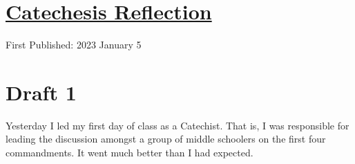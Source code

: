 \documentclass[12pt]{article}[titlepage]
\newcommand{\1}{\={a}}
\newcommand{\2}{\={e}}
\newcommand{\3}{\={\i}}
\newcommand{\4}{\=o}
\newcommand{\5}{\=u}
\newcommand{\6}{\={A}}
\renewcommand{\,}{\textsuperscript{,}}
\begin{document}
\doublespacing
\section{\href{catechesis.html}{Catechesis Reflection}}
First Published: 2023 January 5

\section{Draft 1}
Yesterday I led my first day of class as a Catechist.
That is, I was responsible for leading the discussion amongst a group of middle schoolers on the first four commandments.
It went much better than I had expected.
\end{document}
